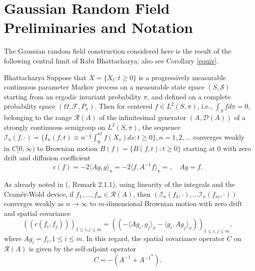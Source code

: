 \documentclass[11pt]{article}
\numberwithin{equation}{section}
\theoremstyle{definition}
\theoremstyle{remark}
\theoremstyle{definition}
\begin{document}
\section{Gaussian Random Field Preliminaries and Notation}\label{grfsec}
The Gaussian random field construction considered here 
is the result of the 
following central limit of Rabi Bhattacharya; also see Corollary \ref{equiv}.
\begin{thm}{Bhattacharya \cite{RBfclt}}
\label{rabifcltthm}
Suppose that $X = \{X_t:t\ge0\}$ is a progressively measurable
continuous parameter
Markov process on a measurable state space $(S,{\mathcal S})$
starting from an ergodic invariant probability $\pi$, and defined
on a complete probability space $(\Omega,{\mathcal F},P_\pi)$.   Then for centered
$f\in L^2(S,\pi)$, i.e., $\int_Sfd\pi=0$,
 belonging to the range ${\mathcal R}({ A})$
of the  infinitesimal generator 
$( A,{\mathcal D}({ A}))$ of a strongly continuous
semigroup on 
$L^2(S,\pi)$, the sequence 
$\mathcal{I}_n(f,\cdot) =\{I_n(f,t)\equiv n^{-\frac{1}{2}}\int_0^{nt}f(X_s)ds: t\ge 0\}, 
n=1,2,\dots$ converges weakly in $C[0,\infty)$ to Brownian
motion $B(f) =\{B(f,t):t\ge0\}$ starting at $0$ with zero drift and 
diffusion coefficient 
\begin{equation}\label{diffcoeff}
c(f) =  -2\langle  Ag,g\rangle_\pi =-2\langle f,A^{-1}f\rangle_\pi =,\quad  Ag = f.
\end{equation}
\end{thm}


As already 
noted in (\cite{RBfclt}, Remark 2.1.1),
 using linearity of the integrals and the Cram\'{e}r-Wold device, 
if $f_1,\dots,f_m\in{\mathcal R}({ A})$,  then
 $(\mathcal{I}_n(f_1,\cdot),\dots \mathcal{I}_n(f_m,\cdot))$ converges weakly as $n\to\infty$
to $m$-dimensional Brownian motion with zero drift
and spatial covariance 
\begin{equation}\label{cltcov}
((c(f_i,f_j)))_{1\le i,j\le m} = ((-\langle Ag_i,g_j\rangle_\pi-\langle g_i, Ag_j\rangle_\pi))_{1\le i,j\le m},
\end{equation}
where $ Ag_i=f_i, 1\le i\le m$. 
In this regard,  the spatial covariance
operator $C$ on $\mathcal{R}(A)$ is given by 
the self-adjoint operator
\begin{equation}\label{rbcov}
C = -(A^{-1} + A{^{-1}}^*).
\end{equation}
 
\end{document}

